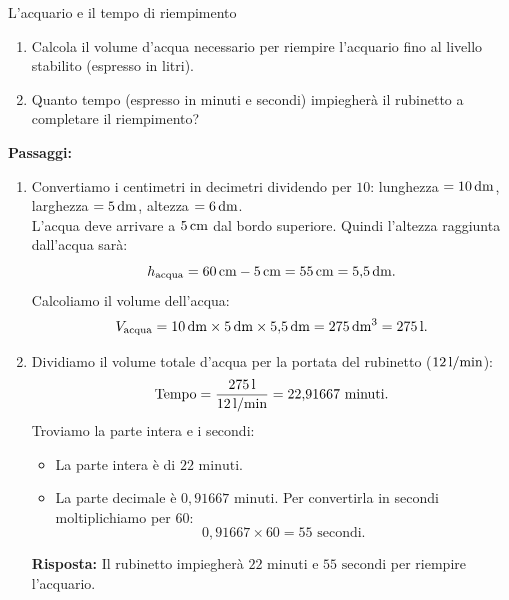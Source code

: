 \begin{esercizio}{L'acquario e il tempo di riempimento}
\begin{center}
\end{center}

\begin{enumerate}[label=\alph*)]
  \item Calcola il volume d'acqua necessario per riempire l'acquario fino al livello stabilito (espresso in litri).
  \item Quanto tempo (espresso in minuti e secondi) impiegherà il rubinetto a completare il riempimento?
\end{enumerate}

\responsespace{5.5cm}

\begin{soluzione}
  \textbf{Passaggi:}
  \begin{enumerate}[label=\alph*)]
    \item Convertiamo i centimetri in decimetri dividendo per $10$: lunghezza $= 10\,\mathrm{dm}$, larghezza $= 5\,\mathrm{dm}$, altezza $= 6\,\mathrm{dm}$.\\
    L'acqua deve arrivare a $5\,\mathrm{cm}$ dal bordo superiore. Quindi l'altezza raggiunta dall'acqua sarà:
    \[
    h_{\text{acqua}} = 60\,\mathrm{cm} - 5\,\mathrm{cm} = 55\,\mathrm{cm} = 5{,}5\,\mathrm{dm}.
    \]
    Calcoliamo il volume dell'acqua:
    \[
    V_{\text{acqua}} = 10\,\mathrm{dm} \times 5\,\mathrm{dm} \times 5{,}5\,\mathrm{dm} = 275\,\mathrm{dm^3} = 275\,\mathrm{l}.
    \]
    \item Dividiamo il volume totale d'acqua per la portata del rubinetto ($12\,\mathrm{l/min}$):
    \[
    \text{Tempo} = \frac{275\,\mathrm{l}}{12\,\mathrm{l/min}} = 22{,}91667\text{ minuti}.
    \]
    Troviamo la parte intera e i secondi:
    \begin{itemize}
      \item La parte intera è di $22\text{ minuti}$.
      \item La parte decimale è $0{,}91667\text{ minuti}$. Per convertirla in secondi moltiplichiamo per $60$:
      \[
      0{,}91667 \times 60 = 55\text{ secondi}.
      \]
    \end{itemize}
    \textbf{Risposta:} Il rubinetto impiegherà $22\text{ minuti e } 55\text{ secondi}$ per riempire l'acquario.
  \end{enumerate}
\end{soluzione}
\end{esercizio}

